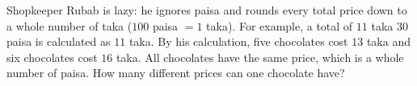 Shopkeeper Rubab is lazy: he ignores paisa and rounds every total price down to a whole number of taka ($100$ paisa $=1$ taka). For example, a total of $11$ taka $30$ paisa is calculated as $11$ taka. By his calculation, five chocolates cost $13$ taka and six chocolates cost $16$ taka. All chocolates have the same price, which is a whole number of paisa. How many different prices can one chocolate have?
